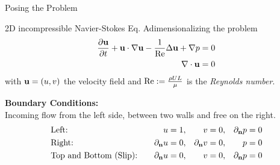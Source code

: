 \begin{frame}{Posing the Problem}

  \begin{block}{2D incompressible Navier-Stokes Eq.}
    Adimensionalizing the problem
    \begin{align*}
      \frac{\partial \textbf{u}}{\partial t} + \textbf{u} \cdot \nabla \textbf{u} - \frac{1}{\mathrm{Re}} \Delta \textbf{u} + \nabla p = 0 \label{eq:Ns_normalized} \\
      \nabla\cdot\boldsymbol{\mathrm{u}} = 0 \notag
    \end{align*}
    with $\boldsymbol{\mathrm{u}} = (u,v)$ the velocity field and $\mathrm{Re} := \frac{\rho U L}{\mu}$ is the \textit{Reynolds number}.
  \end{block}


  \textbf{Boundary Conditions:}\\
  Incoming flow from the left side, between two walls and free on the right.
  \begin{align*}
     & \text{Left:}\quad                  & u                   & = 1, & v                   & = 0, & \partial_{\boldsymbol{\mathrm{n}}} p & = 0 \\
     & \text{Right:}\quad                 & \partial_{\boldsymbol{\mathrm{n}}} u & = 0, & \partial_{\boldsymbol{\mathrm{n}}} v & = 0, & p                   & = 0 \\
     & \text{Top and Bottom (Slip):}\quad & \partial_{\boldsymbol{\mathrm{n}}} u & = 0, & v                   & = 0, & \partial_{\boldsymbol{\mathrm{n}}} p & = 0
  \end{align*}



\end{frame}


